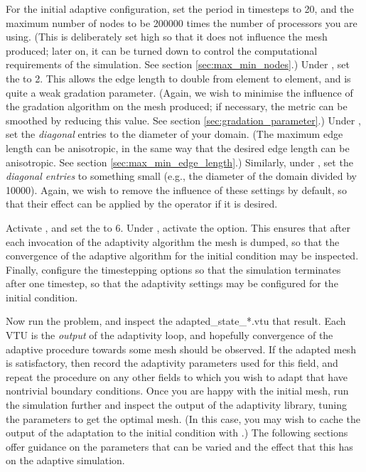 For the initial adaptive configuration, set the period in timesteps to 20, and the maximum number
of nodes to be 200000 times the number of processors you are using. (This is deliberately set high
so that it does not influence the mesh produced; later on, it can be turned down to control the
computational requirements of the simulation. See section \ref{sec:max_min_nodes}.) Under ,
set the  to 2. This allows the edge length to double from element to element,
and is quite a weak gradation parameter. (Again, we wish to minimise the influence of the gradation
algorithm on the mesh produced; if necessary, the metric can be smoothed by reducing this value. See section
\ref{sec:gradation_parameter}.) Under ,
set the \emph{diagonal} entries to the diameter of your domain. (The maximum edge length can be anisotropic,
in the same way that the desired edge length can be anisotropic. See section \ref{sec:max_min_edge_length}.)
Similarly, under , set the
\emph{diagonal entries} to something small (e.g., the diameter of the domain divided by 10000). Again, we wish
to remove the influence of these settings by default, so that their effect can be applied by the operator
if it is desired.

Activate , and set the 
to 6. Under , activate the  option. This
ensures that after each invocation of the adaptivity algorithm the mesh is dumped, so that the convergence of
the adaptive algorithm for the initial condition may be inspected. Finally, configure the timestepping
options so that the simulation terminates after one timestep, so that the adaptivity settings may be configured
for the initial condition.

Now run the problem, and inspect the adapted\_state\_*.vtu that result. Each VTU is the \emph{output}
of the adaptivity loop, and hopefully convergence of the adaptive procedure towards some 
mesh should be observed. If the adapted mesh is satisfactory, then record the adaptivity parameters
used for this field, and repeat the procedure on any other fields to which you wish to adapt that
have nontrivial boundary conditions. Once you are happy with the initial mesh, run the simulation further
and inspect the output of the adaptivity library, tuning the parameters to get the optimal mesh. (In this case, you may wish to cache the output of
the adaptation to the initial condition with .)
The following sections offer guidance on the parameters that can be varied and the effect that
this has on the adaptive simulation.

